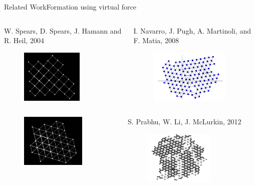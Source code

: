 \documentclass[10pt]{beamer}
\begin{document}
\begin{frame}{Related Work}{Formation using virtual force}
   \begin{columns}[T] 
    \begin{column}{.45\textwidth}
      \scriptsize{W. Spears, D. Spears, J. Hamann and R. Heil, 2004}
      \begin{figure}
        \centering
        \includegraphics[height=1in]{figs/spears1.png}
      \end{figure}
    \end{column}%
    \begin{column}{.45\textwidth}
      \scriptsize{I. Navarro, J. Pugh, A. Martinoli, and
        F. Matia, 2008}
      \begin{figure}
        \centering
        \includegraphics[height=1in]{figs/navarro.png}
      \end{figure}      
    \end{column}
  \end{columns}
  \vspace{3mm}
  \begin{columns}[T] 
    \begin{column}{.45\textwidth}
      \begin{figure}
        \centering
        \includegraphics[height=1in]{figs/spears2.png}     
      \end{figure}  
    \end{column}%
    \begin{column}{.45\textwidth}
      \scriptsize{S. Prabhu, W. Li, J. McLurkin, 2012}
      \begin{figure}
        \centering
        \includegraphics[height=1in]{figs/james.png}
      \end{figure}
    \end{column}
  \end{columns}
\end{frame}
\end{document}
